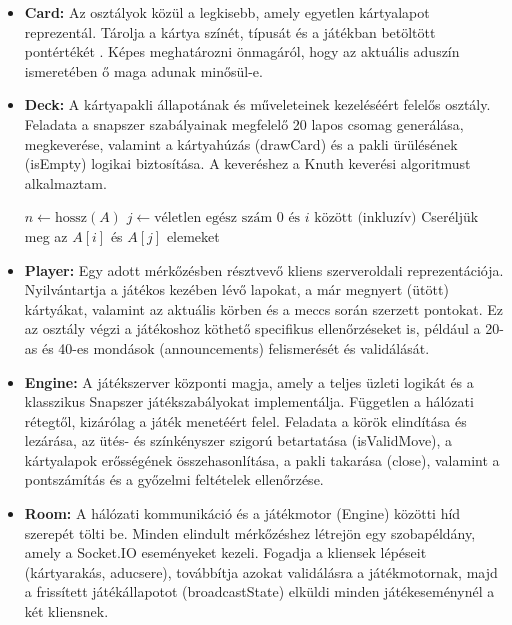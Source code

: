 \begin{itemize}
    \item \textbf{Card:} Az osztályok közül a legkisebb, amely egyetlen kártyalapot reprezentál. Tárolja a kártya színét, típusát és a játékban betöltött pontértékét . Képes meghatározni önmagáról, hogy az aktuális aduszín ismeretében ő maga adunak minősül-e.
    
    \item \textbf{Deck:} A kártyapakli állapotának és műveleteinek kezeléséért felelős osztály. Feladata a snapszer szabályainak megfelelő 20 lapos csomag generálása, megkeverése, valamint a kártyahúzás (drawCard) és a pakli ürülésének (isEmpty) logikai biztosítása. A keveréshez a Knuth keverési algoritmust alkalmaztam.
    
    \begin{algorithm}[H]
    \caption{Fisher--Yates (Knuth) keverés algoritmus}
    \label{alg:fisher_yates}
    \begin{algorithmic}[1]
        \State $n \gets \text{hossz}(A)$
            \State $j \gets \text{véletlen egész szám } 0 \text{ és } i \text{ között (inkluzív)}$
            \State Cseréljük meg az $A[i]$ és $A[j]$ elemeket
        \EndFor
    \EndFunction
    \end{algorithmic}
    \end{algorithm}
    
    \item \textbf{Player:} Egy adott mérkőzésben résztvevő kliens szerveroldali reprezentációja. Nyilvántartja a játékos kezében lévő lapokat, a már megnyert (ütött) kártyákat, valamint az aktuális körben és a meccs során szerzett pontokat. Ez az osztály végzi a játékoshoz köthető specifikus ellenőrzéseket is, például a 20-as és 40-es mondások (announcements) felismerését és validálását.
    
    \item \textbf{Engine:} A játékszerver központi magja, amely a teljes üzleti logikát és a klasszikus Snapszer játékszabályokat implementálja. Független a hálózati rétegtől, kizárólag a játék menetéért felel. Feladata a körök elindítása és lezárása, az ütés- és színkényszer szigorú betartatása (isValidMove), a kártyalapok erősségének összehasonlítása, a pakli takarása (close), valamint a pontszámítás és a győzelmi feltételek ellenőrzése.
    
    \item \textbf{Room:} A hálózati kommunikáció és a játékmotor (Engine) közötti híd szerepét tölti be. Minden elindult mérkőzéshez létrejön egy szobapéldány, amely a Socket.IO eseményeket kezeli. Fogadja a kliensek lépéseit (kártyarakás, aducsere), továbbítja azokat validálásra a játékmotornak, majd a frissített játékállapotot (broadcastState) elküldi minden játékeseménynél a két kliensnek.
\end{itemize}

